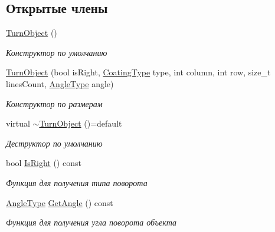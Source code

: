 \subsection*{Открытые члены}
\begin{DoxyCompactItemize}
\item 
\mbox{\label{classrtm_1_1_turn_object_a987baa86c69edf1f23d1fcb2d3140ca9}} 
\hyperlink{classrtm_1_1_turn_object_a987baa86c69edf1f23d1fcb2d3140ca9}{Turn\+Object} ()
\begin{DoxyCompactList}\small\item\em Конструктор по умолчанию \end{DoxyCompactList}\item 
\hyperlink{classrtm_1_1_turn_object_ac673c94a34ee6dd7ece82a41fb8f7930}{Turn\+Object} (bool is\+Right, \hyperlink{namespacertm_aecd3929e64cd461eb3555b611f6fad95}{Coating\+Type} type, int column, int row, size\+\_\+t lines\+Count, \hyperlink{namespacertm_a69dc82b16a0148c10962caa83d930f89}{Angle\+Type} angle)
\begin{DoxyCompactList}\small\item\em Конструктор по размерам \end{DoxyCompactList}\item 
\mbox{\label{classrtm_1_1_turn_object_a50ff1135e100a02294bb433ffd0a7dc6}} 
virtual \hyperlink{classrtm_1_1_turn_object_a50ff1135e100a02294bb433ffd0a7dc6}{$\sim$\+Turn\+Object} ()=default
\begin{DoxyCompactList}\small\item\em Деструктор по умолчанию \end{DoxyCompactList}\item 
bool \hyperlink{classrtm_1_1_turn_object_ab2958c0a469d4835751b304e2bd16084}{Is\+Right} () const
\begin{DoxyCompactList}\small\item\em Функция для получения типа поворота \end{DoxyCompactList}\item 
\hyperlink{namespacertm_a69dc82b16a0148c10962caa83d930f89}{Angle\+Type} \hyperlink{classrtm_1_1_turn_object_ae3fbfdd8e940bbb61d3a68db236d60b5}{Get\+Angle} () const
\begin{DoxyCompactList}\small\item\em Функция для получения угла поворота объекта \end{DoxyCompactList}\end{DoxyCompactItemize}
